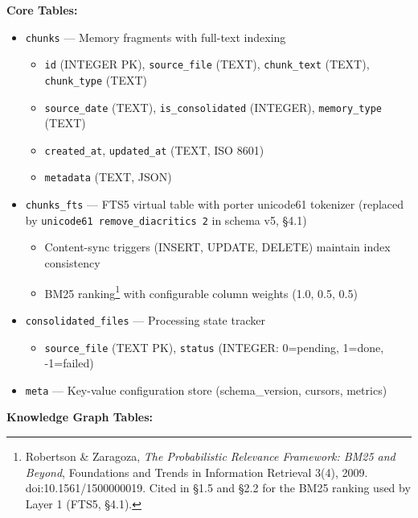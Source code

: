 \documentclass[
]{article}
\providecommand{\tightlist}{%
  \setlength{\itemsep}{0pt}\setlength{\parskip}{0pt}}
\begin{document}
\textbf{Core Tables:}

\begin{itemize}
\tightlist
\item
  \texttt{chunks} --- Memory fragments with full-text indexing

  \begin{itemize}
  \tightlist
  \item
    \texttt{id} (INTEGER PK), \texttt{source\_file} (TEXT),
    \texttt{chunk\_text} (TEXT), \texttt{chunk\_type} (TEXT)
  \item
    \texttt{source\_date} (TEXT), \texttt{is\_consolidated} (INTEGER),
    \texttt{memory\_type} (TEXT)
  \item
    \texttt{created\_at}, \texttt{updated\_at} (TEXT, ISO 8601)
  \item
    \texttt{metadata} (TEXT, JSON)
  \end{itemize}
\item
  \texttt{chunks\_fts} --- FTS5 virtual table with porter unicode61
  tokenizer (replaced by \texttt{unicode61\ remove\_diacritics\ 2} in
  schema v5, §4.1)

  \begin{itemize}
  \tightlist
  \item
    Content-sync triggers (INSERT, UPDATE, DELETE) maintain index
    consistency
  \item
    BM25 ranking\footnote{Robertson \& Zaragoza, \emph{The Probabilistic
      Relevance Framework: BM25 and Beyond}, Foundations and Trends in
      Information Retrieval 3(4), 2009. doi:10.1561/1500000019. Cited in
      §1.5 and §2.2 for the BM25 ranking used by Layer 1 (FTS5, §4.1).}
    with configurable column weights (1.0, 0.5, 0.5)
  \end{itemize}
\item
  \texttt{consolidated\_files} --- Processing state tracker

  \begin{itemize}
  \tightlist
  \item
    \texttt{source\_file} (TEXT PK), \texttt{status} (INTEGER:
    0=pending, 1=done, -1=failed)
  \end{itemize}
\item
  \texttt{meta} --- Key-value configuration store (schema\_version,
  cursors, metrics)
\end{itemize}

\textbf{Knowledge Graph Tables:}
\end{document}
